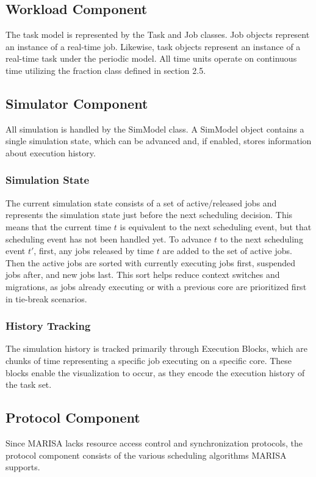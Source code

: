 \documentclass[conference,compsoc]{IEEEtran}
\begin{document}
\subsection{Workload Component}
The task model is represented by the Task and Job classes. Job objects represent an instance of a real-time job. Likewise, task objects represent an instance of a real-time task under the periodic model. All time units operate on continuous time utilizing the fraction class defined in section 2.5.

\subsection{Simulator Component}
All simulation is handled by the SimModel class. A SimModel object contains a single simulation state, which can be advanced and, if enabled, stores information about execution history.

\subsubsection{Simulation State}
The current simulation state consists of a set of active/released jobs and represents the simulation state just before the next scheduling decision. This means that the current time $t$ is equivalent to the next scheduling event, but that scheduling event has not been handled yet. To advance $t$ to the next scheduling event $t'$, first, any jobs released by time $t$ are added to the set of active jobs. Then the active jobs are sorted with currently executing jobs first, suspended jobs after, and new jobs last. This sort helps reduce context switches and migrations, as jobs already executing or with a previous core are prioritized first in tie-break scenarios.

\subsubsection{History Tracking}
The simulation history is tracked primarily through Execution Blocks, which are chunks of time representing a specific job executing on a specific core. These blocks enable the visualization to occur, as they encode the execution history of the task set.

\subsection{Protocol Component}
Since MARISA lacks resource access control and synchronization protocols, the protocol component consists of the various scheduling algorithms MARISA supports.
\end{document}
